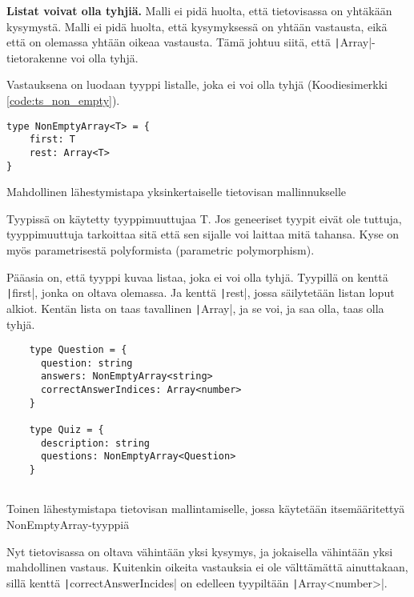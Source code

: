 \textbf{Listat voivat olla tyhjiä.} Malli ei pidä huolta, että tietovisassa on yhtäkään kysymystä. Malli ei pidä huolta, että kysymyksessä on yhtään vastausta, eikä että on olemassa yhtään oikeaa vastausta. Tämä johtuu siitä, että \texttt|Array|-tietorakenne voi olla tyhjä.

Vastauksena on luodaan tyyppi listalle, joka ei voi olla tyhjä (Koodiesimerkki \ref{code:ts_non_empty}).

\begin{code}
    \begin{verbatim}
type NonEmptyArray<T> = {
    first: T
    rest: Array<T>
}
    \end{verbatim}
    \caption{Mahdollinen lähestymistapa yksinkertaiselle tietovisan mallinnukselle}
    \label{code:ts_non_empty}
\end{code}

Tyypissä on käytetty tyyppimuuttujaa T. Jos geneeriset tyypit eivät ole tuttuja, tyyppimuuttuja tarkoittaa sitä että sen sijalle voi laittaa mitä tahansa. Kyse on myös parametrisestä polyformista (parametric polymorphism).

Pääasia on, että tyyppi kuvaa listaa, joka ei voi olla tyhjä. Tyypillä on kenttä \texttt|first|, jonka on oltava olemassa. Ja kenttä \texttt|rest|, jossa säilytetään listan loput alkiot. Kentän lista on taas tavallinen \texttt|Array|, ja se voi, ja saa olla, taas olla tyhjä.


\begin{code}
    \begin{verbatim}
    type Question = {
      question: string
      answers: NonEmptyArray<string> 
      correctAnswerIndices: Array<number>
    }
    
    type Quiz = {
      description: string
      questions: NonEmptyArray<Question> 
    }
             
    \end{verbatim}
    \caption{Toinen lähestymistapa tietovisan mallintamiselle, jossa käytetään itsemääritettyä NonEmptyArray-tyyppiä}
    \label{code:ts_non_empty_quiz}
\end{code}

Nyt tietovisassa on oltava vähintään yksi kysymys, ja jokaisella vähintään yksi mahdollinen vastaus. Kuitenkin oikeita vastauksia ei ole välttämättä ainuttakaan, sillä kenttä \texttt|correctAnswerIncides| on edelleen tyypiltään \texttt|Array<number>|.

